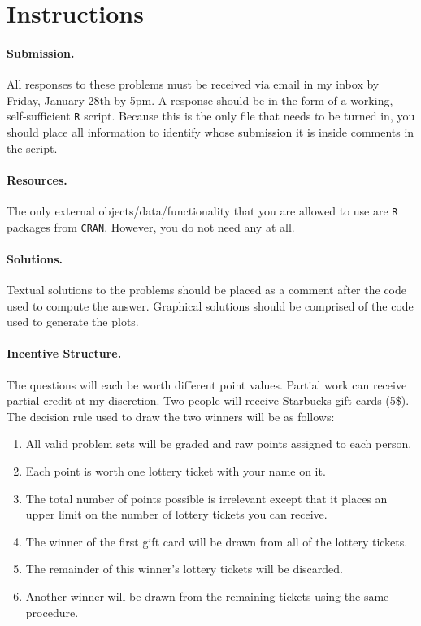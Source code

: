 \documentclass[10pt,letterpaper]{article}
\author{}
\title{}
\date{}
\begin{document}

\section*{Instructions}
\paragraph{Submission.} All responses to these problems must be
received via email in my inbox by Friday, January 28th by 5pm. A
response should be in the form of a working, self-sufficient
\texttt{R} script. Because this is the only file that needs to be
turned in, you should place all information to identify whose
submission it is inside comments in the script.

\paragraph*{Resources.} The only external objects/data/functionality
that you are allowed to use are \texttt{R} packages from
\texttt{CRAN}. However, you do not need any at all.

\paragraph*{Solutions.} Textual solutions to the problems should be
placed as a comment after the code used to compute the
answer. Graphical solutions should be comprised of the code used to
generate the plots.

\paragraph*{Incentive Structure.} The questions will each be worth
different point values. Partial work can receive partial credit at my
discretion. Two people will receive Starbucks gift cards (5\$). The
decision rule used to draw the two winners will be as follows:
\begin{enumerate}
\item All valid problem sets will be graded and raw points assigned to
  each person.
\item Each point is worth one lottery ticket with your name on it.
\item The total number of points possible is irrelevant except that it
  places an upper limit on the number of lottery tickets you can
  receive.
\item The winner of the first gift card will be drawn from all of the
  lottery tickets.
\item The remainder of this winner's lottery tickets will be discarded.
\item Another winner will be drawn from the remaining tickets using
  the same procedure.
\end{enumerate}
\end{document}
